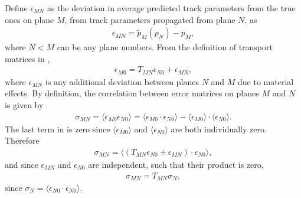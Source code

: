 Define $\epsilon_{MN}$ as the deviation in average predicted track parameters from the true ones on plane $M$, from track parameters propagated from plane $N$, as
	\begin{align}
		\epsilon_{MN} = \widetilde{p}_{M}(p_{N}) - p_{M}, 
	\end{align}
where $N < M$ can be any plane numbers. From the definition of transport matrices in ,
	\begin{align}
		\epsilon_{M0} = T_{MN} \epsilon_{N0} + \epsilon_{MN},
	\end{align}
where $\epsilon_{MN}$ is any additional deviation between planes $N$ and $M$ due to material effects. By definition, the correlation between error matrices on planes $M$ and $N$ is given by 
	\begin{align} \label{eq:corrTrackMatDefinition}
		\sigma_{MN} = \langle \epsilon_{M0} \epsilon_{N0} \rangle = \langle \epsilon_{M0} \cdot \epsilon_{N0} \rangle - \langle \epsilon_{M0} \rangle \cdot \langle \epsilon_{N0} \rangle.
	\end{align}
The last term in  is zero since $\langle \epsilon_{M0} \rangle$ and $\langle \epsilon_{N0} \rangle$ are both individually zero. Therefore 
	\begin{align}
		\sigma_{MN} = \langle ( T_{MN} \epsilon_{N0} + \epsilon_{MN}) \cdot \epsilon_{N0} \rangle,
	\end{align}
and since $\epsilon_{MN}$ and $\epsilon_{N0}$ are independent, such that their product is zero,
	\begin{align}
		\sigma_{MN} = T_{MN} \sigma_{N},
	\end{align}
since $\sigma_{N} = \langle \epsilon_{N0} \cdot \epsilon_{N0} \rangle$.




